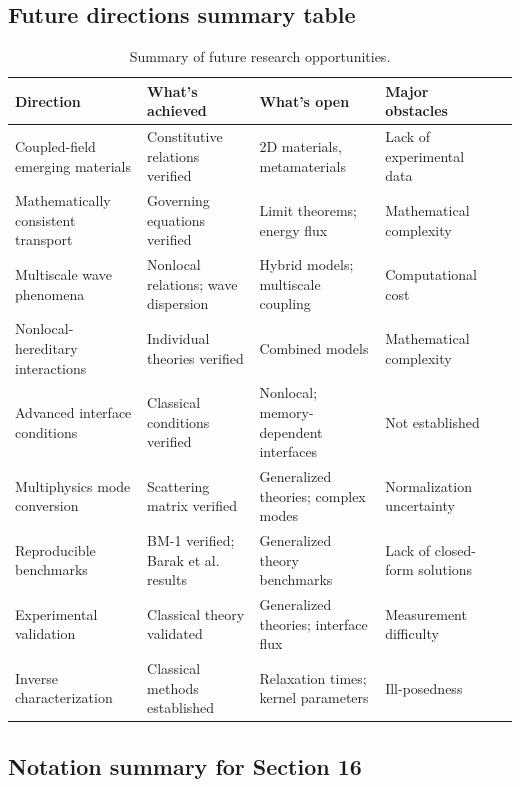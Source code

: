 \subsection{Future directions summary table}
\label{sec:16.10}

\begin{table}[h]
\centering
\small
\caption{Summary of future research opportunities.}
\label{tab:future_summary}
\begin{tabularx}{\textwidth}{@{}lXXXX@{}}
\toprule
\textbf{Direction} & \textbf{What's achieved} & \textbf{What's open} & \textbf{Major obstacles} \\
\midrule
Coupled-field emerging materials & Constitutive relations verified & 2D materials, metamaterials & Lack of experimental data \\
Mathematically consistent transport & Governing equations verified & Limit theorems; energy flux & Mathematical complexity \\
Multiscale wave phenomena & Nonlocal relations; wave dispersion & Hybrid models; multiscale coupling & Computational cost \\
Nonlocal-hereditary interactions & Individual theories verified & Combined models & Mathematical complexity \\
Advanced interface conditions & Classical conditions verified & Nonlocal; memory-dependent interfaces & Not established \\
Multiphysics mode conversion & Scattering matrix verified & Generalized theories; complex modes & Normalization uncertainty \\
Reproducible benchmarks & BM-1 verified; Barak et al.~\cite{Barak2023} results & Generalized theory benchmarks & Lack of closed-form solutions \\
Experimental validation & Classical theory validated & Generalized theories; interface flux & Measurement difficulty \\
Inverse characterization & Classical methods established & Relaxation times; kernel parameters & Ill-posedness \\
\bottomrule
\end{tabularx}
\end{table}

\subsection{Notation summary for Section 16}

